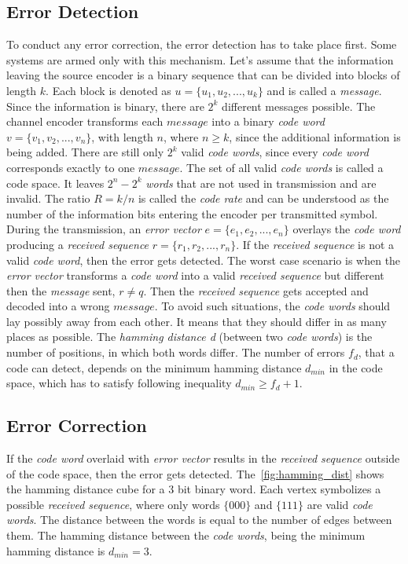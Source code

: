 \subsection{Error Detection}
To conduct any error correction, the error detection has to take place first. Some systems are armed only with this mechanism. Let's assume that the information leaving the source encoder is a binary sequence that can be divided into blocks of length $k$. Each block is denoted as $u=\{u_1,u_2,...,u_k\}$ and is called a \textit{message}. Since the information is binary, there are $2^k$ different messages possible. The channel encoder transforms each $message$ into a binary \textit{code word} $v=\{v_1,v_2,...,v_n\}$, with length $n$, where $n\geq k$, since the additional information is being added. There are still only $2^k$ valid \textit{code words}, since every \textit{code word} corresponds exactly to one $message$. The set of all valid \textit{code words} is called a code space. It leaves $2^n - 2^k$ \textit{words} that are not used in transmission and are invalid. The ratio $R=k/n$ is called the \textit{code rate} and can be understood as the number of the information bits entering the encoder per transmitted symbol. During the transmission, an \textit{error vector} $e=\{e_1,e_2,...,e_n\}$ overlays the \textit{code word} producing a \textit{received sequence} $r=\{r_1,r_2,...,r_n\}$. If the \textit{received sequence} is not a valid \textit{code word}, then the error gets detected. The worst case scenario is when the \textit{error vector} transforms a \textit{code word} into a valid \textit{received sequence} but different then the \textit{message} sent, $r\neq q$. Then the \textit{received sequence} gets accepted and decoded into a wrong $message$. To avoid such situations, the \textit{code words} should lay possibly away from each other. It means that they should differ in as many places as possible. The \textit{hamming distance d} (between two \textit{code words}) is the number of positions, in which both words differ. The number of errors $f_d$, that a code can detect, depends on the minimum hamming distance $d_{min}$ in the code space, which has to satisfy following inequality $d_{min} \geq f_d + 1$.
\subsection{Error Correction}
If the \textit{code word} overlaid with \textit{error vector} results in the \textit{received sequence} outside of the code space, then the error gets detected. The~\autoref{fig:hamming_dist} shows the hamming distance cube for a 3 bit binary word. Each vertex symbolizes a possible \textit{received sequence}, where only words $\{000\}$ and $\{111\}$ are valid \textit{code words}. The distance between the words is equal to the number of edges between them. The hamming distance between the \textit{code words}, being the minimum hamming distance is $d_{min}=3$.

